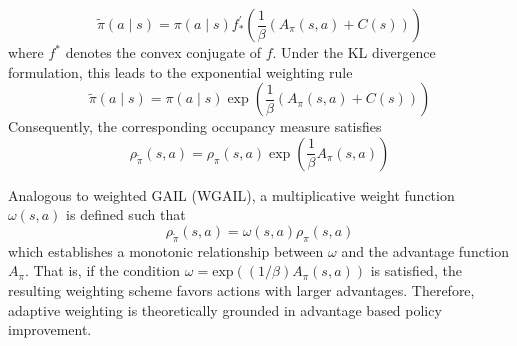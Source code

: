 \documentclass[journal]{IEEEtran}
\begin{document}
\begin{equation}
  \widetilde{\pi}(a \mid s)=\pi(a \mid s) f_{*}^{\prime}\left(\frac{1}{\beta}\left(A_{\pi}(s, a)+C(s)\right)\right)
\end{equation}
where $f^*$ denotes the convex conjugate of $f$. Under the KL divergence formulation, this leads to the exponential weighting rule
\begin{equation}
  \widetilde{\pi}(a \mid s)=\pi(a \mid s) \exp \left(\frac{1}{\beta}\left(A_{\pi}(s, a)+C(s)\right)\right)
\end{equation}
Consequently, the corresponding occupancy measure satisfies
\begin{equation}
  \rho_{\widetilde{\pi}}(s, a)=\rho_{\pi}(s, a) \exp \left(\frac{1}{\beta}A_{\pi}(s, a)\right)
\end{equation}


Analogous to weighted GAIL (WGAIL)\cite{wang2021learning}, a multiplicative weight function $\omega(s,a)$ is defined such that
\begin{equation}
  \rho_{\widetilde{\pi}}(s, a)= \omega(s, a)\rho_{\pi}(s, a) 
\end{equation}
which establishes a monotonic relationship between $\omega$ and the advantage function $A_\pi$. That is, if the condition $\omega = \text{exp}((1/\beta)A_\pi(s, a))$ is satisfied, the resulting weighting scheme favors actions with larger advantages. Therefore, adaptive weighting is theoretically grounded in advantage based policy improvement.


\end{document}
